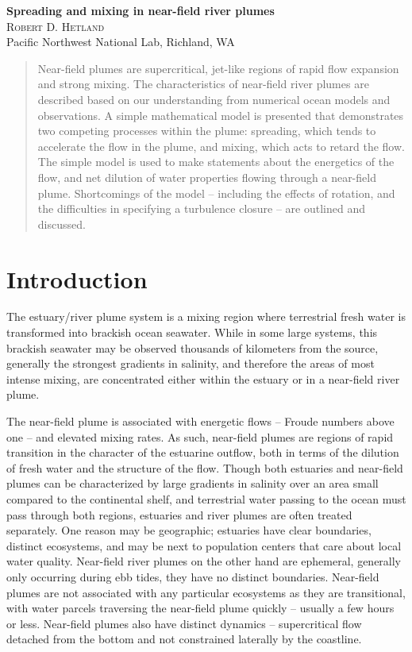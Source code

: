\documentclass[12pt]{article}
\begin{document}
\vfill
\noindent
{\large\bfseries Spreading and mixing in near-field river plumes}\\
\noindent
{\scshape Robert D. Hetland}\\
\noindent
{\footnotesize Pacific Northwest National Lab, Richland, WA}


\begin{abstract}
  \small{Near-field plumes are supercritical, jet-like regions of rapid flow expansion and strong mixing. The characteristics of near-field river plumes are described based on our understanding from numerical ocean models and observations. A simple mathematical model is presented that demonstrates two competing processes within the plume: spreading, which tends to accelerate the flow in the plume, and mixing, which acts to retard the flow. The simple model is used to make statements about the energetics of the flow, and net dilution of water properties flowing through a near-field plume. Shortcomings of the model -- including the effects of rotation, and the difficulties in specifying a turbulence closure -- are outlined and discussed.}
\end{abstract}


\section{Introduction}

The estuary/river plume system is a mixing region where terrestrial fresh water is transformed into brackish ocean seawater. While in some large systems, this brackish seawater may be observed thousands of kilometers from the source, generally the strongest gradients in salinity, and therefore the areas of most intense mixing, are concentrated either within the estuary or in a near-field river plume. 

The near-field plume is associated with energetic flows -- Froude numbers above one -- and elevated mixing rates. As such, near-field plumes are regions of rapid transition in the character of the estuarine outflow, both in terms of the dilution of fresh water and the structure of the flow. Though both estuaries and near-field plumes can be characterized by large gradients in salinity over an area small compared to the continental shelf, and terrestrial water passing to the ocean must pass through both regions, estuaries and river plumes are often treated separately. One reason may be geographic; estuaries have clear boundaries, distinct ecosystems, and may be next to population centers that care about local water quality. Near-field river plumes on the other hand are ephemeral, generally only occurring during ebb tides, they have no distinct boundaries. Near-field plumes are not associated with any particular ecosystems as they are transitional, with water parcels traversing the near-field plume quickly -- usually a few hours or less. Near-field plumes also have distinct dynamics -- supercritical flow detached from the bottom and not constrained laterally by the coastline.
\end{document}
